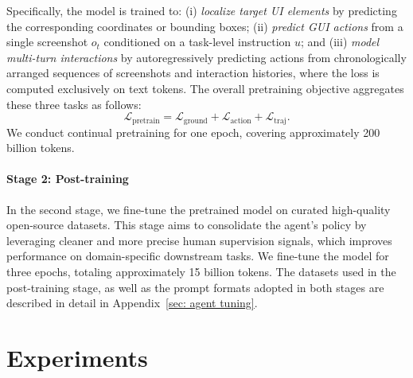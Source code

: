 \documentclass{article}
\theoremstyle{plain}
\theoremstyle{definition}
\theoremstyle{remark}
\begin{document}
Specifically, the model is trained to: (i) \textit{localize target UI elements} by predicting the corresponding coordinates or bounding boxes; (ii) \textit{predict GUI actions} from a single screenshot $o_t$ conditioned on a task-level instruction $u$; and (iii) \textit{model multi-turn interactions} by autoregressively predicting actions from chronologically arranged sequences of screenshots and interaction histories, where the loss is computed exclusively on text tokens.
The overall pretraining objective aggregates these three tasks as follows:
\begin{equation}
\mathcal{L}_{\text{pretrain}} = \mathcal{L}_{\text{ground}} + \mathcal{L}_{\text{action}} + \mathcal{L}_{\text{traj}}.
\end{equation}
We conduct continual pretraining for one epoch, covering approximately 200 billion tokens.

\paragraph{Stage 2: Post-training}
In the second stage, we fine-tune the pretrained model on curated high-quality open-source datasets. This stage aims to consolidate the agent's policy by leveraging cleaner and more precise human supervision signals, which improves performance on domain-specific downstream tasks.  We fine-tune the model for three epochs, totaling approximately 15 billion tokens. The datasets used in the post-training stage, as well as the prompt formats adopted in both stages are described in detail in Appendix~\ref{sec: agent tuning}.


\section{Experiments}
\end{document}
